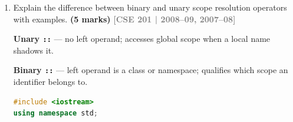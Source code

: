 \documentclass[12pt,a3paper]{article}
\newcommand{\yr}[1]{\hfill\textcolor{gray}{\small\textbf{[#1]}}}
\newcommand{\mk}[1]{\textcolor{orange!70!black}{\small\textbf{(#1 marks)}}}
\begin{document}
\begin{enumerate}
\begin{tcolorbox}
\medskip
\textbf{(ii) this pointer:}

Inside every non-static member function, \texttt{this} is an implicit
pointer to the \textbf{current object}. It is used to resolve
ambiguity between member variables and parameters, and to return the
current object.

\begin{lstlisting}[language=C++]
class Point {
    int x, y;
public:
    Point(int x, int y) {
        this->x = x;   // disambiguates member from parameter
        this->y = y;
    }
    Point& move(int dx, int dy) {
        x += dx; y += dy;
        return *this;  // return current object for chaining
    }
};
\end{lstlisting}

\medskip
\textbf{(iii) inline function:}

An \texttt{inline} function is a hint to the compiler to replace each
call with the function body, eliminating call overhead. It is best for
small, frequently called functions.

\begin{lstlisting}[language=C++]
inline int cube(int x) { return x * x * x; }

int main() {
    int r = cube(3);   // compiler may expand to: 3*3*3
    // r = 27
}
\end{lstlisting}

Declaring a function inside a class body makes it implicitly inline.
\end{tcolorbox}

\item Explain the difference between binary and unary scope resolution operators with examples. \mk{5}
\yr{CSE 201 | 2008--09, 2007--08}


\begin{tcolorbox}[enhanced,breakable,ansbox,colback=cC!4,colframe=cC,
  boxrule=0.8pt,arc=5pt,
  title={\textbf{Answer --- S3-Q24-25: Binary and unary scope resolution operators}},
  fonttitle=\bfseries\color{white},colbacktitle=cC]

\textbf{Unary \texttt{::}} --- no left operand; accesses global scope
when a local name shadows it.

\textbf{Binary \texttt{::}} --- left operand is a class or namespace;
qualifies which scope an identifier belongs to.

\begin{lstlisting}[language=C++]
#include <iostream>
using namespace std;


\end{lstlisting}
\end{tcolorbox}
\end{enumerate}
\end{document}
